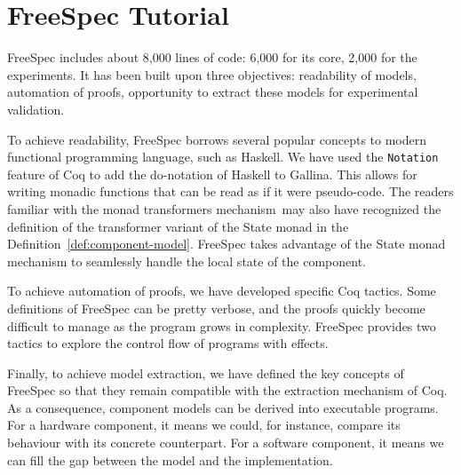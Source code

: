 \chapter{FreeSpec Tutorial}

FreeSpec includes about 8,000 lines of code: 6,000 for its core, 2,000 for the
experiments.
%
It has been built upon three objectives: readability of models, automation of
proofs, opportunity to extract these models for experimental validation.

To achieve readability, FreeSpec borrows several popular concepts to modern
functional programming language, such as Haskell.
%
We have used the \texttt{Notation} feature of Coq to add the do-notation of
Haskell to {\textsc Gallina}.
%
This allows for writing monadic functions that can be read as if it were
pseudo-code.
%
The readers familiar with the monad transformers mechanism\,\cite{liang1995mtl}
may also have recognized the definition of the transformer variant of the State
monad in the Definition~\ref{def:component-model}.
%
FreeSpec takes advantage of the State monad mechanism to seamlessly handle the
local state of the component.
%

To achieve automation of proofs, we have developed specific Coq tactics.
%
Some definitions of FreeSpec can be pretty verbose, and the proofs quickly
become difficult to manage as the program grows in complexity.
%
FreeSpec provides two tactics to explore the control flow of programs with
effects.

Finally, to achieve model extraction, we have defined the key concepts of
FreeSpec so that they remain compatible with the extraction mechanism of Coq.
%
As a consequence, component models can be derived into executable programs.
%
For a hardware component, it means we could, for instance, compare its behaviour
with its concrete counterpart.
%
For a software component, it means we can fill the gap between the model and the
implementation.
